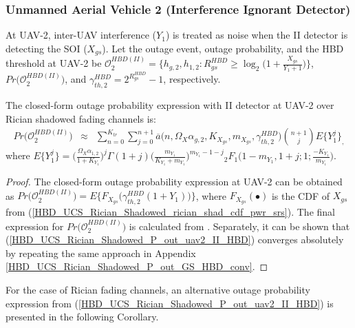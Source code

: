 \subsubsection{Unmanned Aerial Vehicle 2 (Interference Ignorant Detector)}
At UAV-2, inter-UAV interference ($Y_1$) is treated as noise when the II detector is detecting the SOI ($X_{gs}$). Let the outage event, outage probability, and the HBD threshold at UAV-2 be $\mathcal{O}_{2}^{HBD(II)} = \Big\{ h_{g,2}, h_{1,2} : R_{gs}^{HBD} \geq \log_{2}\Big(1+\frac{X_{gs}}{Y_{1} + 1}\Big)\Big\}$, $Pr\big(\mathcal{O}_{2}^{HBD(II)}\big)$, and $\gamma_{th,2}^{HBD} = 2^{R_{gs}^{HBD}}-1$, respectively. 

\begin{theorem} \label{HBD_UCS_Rician_Shadowed_P_out_uav2_II_HBD_theorem}
The closed-form outage probability expression with II detector at UAV-2 over Rician shadowed fading channels is:
\begin{eqnarray} \label{HBD_UCS_Rician_Shadowed_P_out_uav2_II_HBD}
Pr\big(\mathcal{O}_{2}^{HBD(II)}\big) & \approx & \sum_{n=0}^{K_{tr}} \sum_{j=0}^{n+1} \overline{a}\big(n,\Omega_X\alpha_{g,2},K_{X_{gs}},m_{X_{gs}},\gamma_{th,2}^{HBD}\big) \binom{n+1}{j} E\{Y_1^{j}\}_,
\end{eqnarray}
where $E\{Y_1^{j}\} = \Big(\frac{\Omega_X\alpha_{1,2}}{1+K_{Y_1}}\Big)^j \Gamma(1+j) \Big(\frac{m_{Y_1}}{K_{Y_1}+m_{Y_1}}\Big)^{m_{Y_1}-1-j} {}_2F_1\Big(1-m_{Y_1},1+j;1;\frac{-K_{Y_1}}{m_{Y_1}}\Big)$.
\end{theorem}
\begin{proof}
The closed-form outage probability expression at UAV-2 can be obtained as $Pr\big(\mathcal{O}_{2}^{HBD(II)}\big) = E\Big\{F_{X_{gs}}\Big( \gamma_{th,2}^{HBD}(1+Y_1) \Big)\Big\}$, where $F_{X_{gs}}(\bullet)$ is the CDF of $X_{gs}$ from (\ref{HBD_UCS_Rician_Shadowed_rician_shad_cdf_pwr_srs}). The final expression for $Pr\big(\mathcal{O}_{2}^{HBD(II)}\big)$ is calculated from \cite[eq. (8)]{rached2017unified}. Separately, it can be shown that (\ref{HBD_UCS_Rician_Shadowed_P_out_uav2_II_HBD}) converges absolutely by repeating the same approach in Appendix \ref{HBD_UCS_Rician_Shadowed_P_out_GS_HBD_conv}.
\end{proof}

For the case of Rician fading channels, an alternative outage probability expression from (\ref{HBD_UCS_Rician_Shadowed_P_out_uav2_II_HBD}) is presented in the following Corollary.

